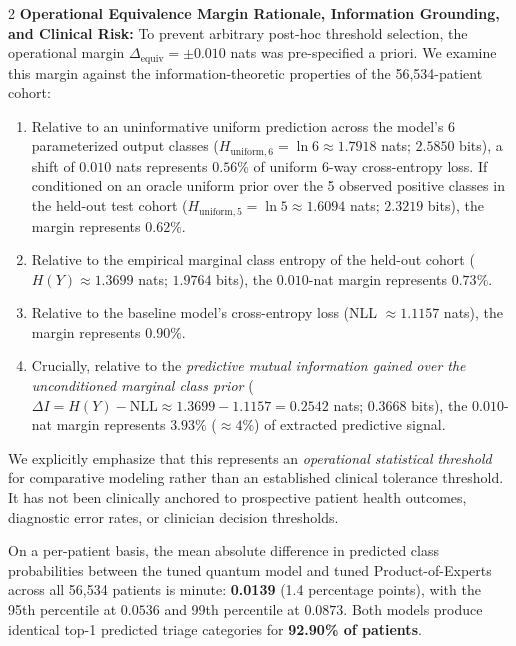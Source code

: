 \documentclass[10pt,a4paper,twoside]{article}
\begin{document}
\begin{multicols}{2}
\noindent\textbf{Operational Equivalence Margin Rationale, Information Grounding, and Clinical Risk:} To prevent arbitrary post-hoc threshold selection, the operational margin $\Delta_{\text{equiv}} = \pm 0.010$ nats was pre-specified a priori. We examine this margin against the information-theoretic properties of the 56,534-patient cohort:
\begin{enumerate}
  \setlength{\itemsep}{1pt}
  \setlength{\parskip}{0pt}
  \item Relative to an uninformative uniform prediction across the model's 6 parameterized output classes ($H_{\text{uniform}, 6} = \ln 6 \approx 1.7918$ nats; $2.5850$ bits), a shift of $0.010$ nats represents $0.56\%$ of uniform 6-way cross-entropy loss. If conditioned on an oracle uniform prior over the 5 observed positive classes in the held-out test cohort ($H_{\text{uniform}, 5} = \ln 5 \approx 1.6094$ nats; $2.3219$ bits), the margin represents $0.62\%$.
  \item Relative to the empirical marginal class entropy of the held-out cohort ($H(Y) \approx 1.3699$ nats; $1.9764$ bits), the $0.010$-nat margin represents $0.73\%$.
  \item Relative to the baseline model's cross-entropy loss (NLL $\approx 1.1157$ nats), the margin represents $0.90\%$.
  \item Crucially, relative to the \textit{predictive mutual information gained over the unconditioned marginal class prior} ($\Delta I = H(Y) - \text{NLL} \approx 1.3699 - 1.1157 = 0.2542$ nats; $0.3668$ bits), the $0.010$-nat margin represents $\mathbf{3.93\%}$ ($\approx 4\%$) of extracted predictive signal.
\end{enumerate}
We explicitly emphasize that this represents an \textit{operational statistical threshold} for comparative modeling rather than an established clinical tolerance threshold. It has not been clinically anchored to prospective patient health outcomes, diagnostic error rates, or clinician decision thresholds. 

On a per-patient basis, the mean absolute difference in predicted class probabilities between the tuned quantum model and tuned Product-of-Experts across all 56,534 patients is minute: \textbf{0.0139} (1.4 percentage points), with the 95th percentile at $0.0536$ and 99th percentile at $0.0873$. Both models produce identical top-1 predicted triage categories for \textbf{92.90\% of patients}.


\end{multicols}
\end{document}
